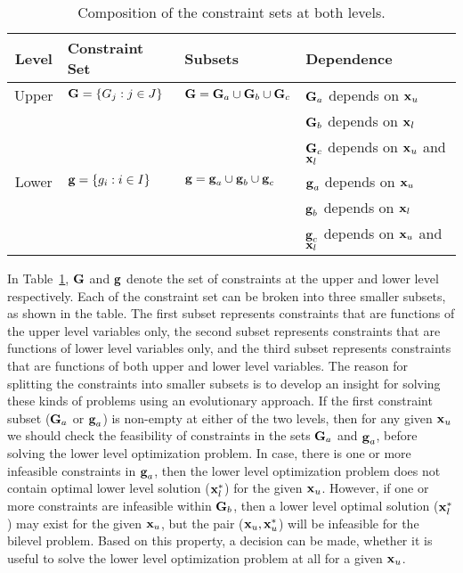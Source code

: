 \documentclass[twoside]{article}
\begin{document}
\begin{table}[h]
\begin{center}
    \begin{tabular}{|c|l|l|l|}
        \hline
Level &        Constraint Set               &       Subsets         & Dependence \\ \hline
Upper      &  $\mbox{$\mathbf{G}$} = \{G_j:j \in J\}$ & $\mbox{$\mathbf{G}$} = \mbox{$\mathbf{G}$}_a \cup \mbox{$\mathbf{G}$}_b \cup \mbox{$\mathbf{G}$}_c$ & $\mbox{$\mathbf{G}$}_a$ depends on $\mbox{$\mathbf{x}$}_u$\\
           &                             &                                                 & $\mbox{$\mathbf{G}$}_b$ depends on $\mbox{$\mathbf{x}$}_l$\\
           &                             &                                                 & $\mbox{$\mathbf{G}$}_c$ depends on $\mbox{$\mathbf{x}$}_u$ and $\mbox{$\mathbf{x}$}_l$\\ \hline
Lower      &  $\mbox{$\mathbf{g}$} = \{g_i:i \in I\}$ & $\mbox{$\mathbf{g}$} = \mbox{$\mathbf{g}$}_a \cup \mbox{$\mathbf{g}$}_b \cup \mbox{$\mathbf{g}$}_c$ & $\mbox{$\mathbf{g}$}_a$ depends on $\mbox{$\mathbf{x}$}_u$\\
           &                             &                                                 & $\mbox{$\mathbf{g}$}_b$ depends on $\mbox{$\mathbf{x}$}_l$\\
           &                             &                                                 & $\mbox{$\mathbf{g}$}_c$ depends on $\mbox{$\mathbf{x}$}_u$ and $\mbox{$\mathbf{x}$}_l$\\ \hline
    \end{tabular}
\caption{Composition of the constraint sets at both levels.}
\label{tab:constraintSets}
\end{center}
\end{table}

In Table~\ref{tab:constraintSets}, $\mbox{$\mathbf{G}$}$ and $\mbox{$\mathbf{g}$}$ denote the set of constraints at the upper and lower level respectively. Each of the constraint set can be broken into three smaller subsets, as shown in the table. The first subset represents constraints that are functions of the upper level variables only, the second subset represents constraints that are functions of lower level variables only, and the third subset represents constraints that are functions of both upper and lower level variables. The reason for splitting the constraints into smaller subsets is to develop an insight for solving these kinds of problems using an evolutionary approach. If the first constraint subset ($\mbox{$\mathbf{G}$}_a$ or $\mbox{$\mathbf{g}$}_a$) is non-empty at either of the two levels, then for any given $\mbox{$\mathbf{x}$}_{u}$ we should check the feasibility of constraints in the sets $\mbox{$\mathbf{G}$}_a$ and $\mbox{$\mathbf{g}$}_a$, before solving the lower level optimization problem. In case, there is one or more infeasible constraints in $\mbox{$\mathbf{g}$}_a$, then the lower level optimization problem does not contain optimal lower level solution ($\mbox{$\mathbf{x}$}_{l}^{*}$) for the given $\mbox{$\mathbf{x}$}_u$. However, if one or more constraints are infeasible within $\mbox{$\mathbf{G}$}_b$, then a lower level optimal solution ($\mbox{$\mathbf{x}$}_{l}^{*}$) may exist for the given $\mbox{$\mathbf{x}$}_u$, but the pair ($\mbox{$\mathbf{x}$}_u,\mbox{$\mathbf{x}$}_{u}^{*}$) will be infeasible for the bilevel problem. Based on this property, a decision can be made, whether it is useful to solve the lower level optimization problem at all for a given $\mbox{$\mathbf{x}$}_u$.
\end{document}
